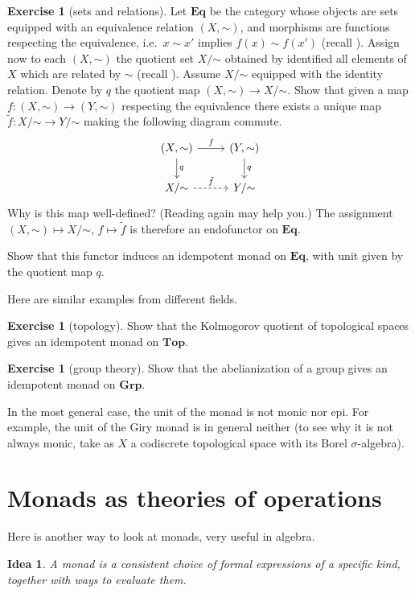 \documentclass[12pt,oneside,headings=small]{scrbook}
\def\simord{\mathord\sim}
\numberwithin{equation}{section}
\theoremstyle{plain}
\newtheorem*{idea}{Idea}
\theoremstyle{definition}
\newtheorem{ex}[thm]{Exercise}
\newcommand{\cat}[1]{{\mathbf{#1}}} %
\newcommand{\ar}[2][]{\arrow{#2}{#1}}
\newcommand{\uni}[2][]{\arrow[dashrightarrow]{#2}{#1}} %
\DeclareMathOperator{\1}{\mathbbm{1}}
\DeclareMathOperator{\2}{\mathbbm{2}}
\begin{document}
\begin{ex}[sets and relations]
 Let $\cat{Eq}$ be the category whose objects are sets equipped with an equivalence relation $(X,\simord)$, and morphisms are functions respecting the equivalence, i.e.~$x\sim x'$ implies $f(x)\sim f(x')$ (recall ).   
 Assign now to each $(X,\simord)$ the quotient set $X/\simord$ obtained by identified all elements of $X$ which are related by $\sim$ (recall ). Assume $X/\simord$ equipped with the identity relation. Denote by $q$ the quotient map $(X,\simord)\to X/\simord$.
 Show that given a map $f:(X,\simord)\to(Y,\simord)$ respecting the equivalence there exists a unique map $\tilde{f}:X/\simord\to Y/\simord$ making the following diagram commute.
 $$
 \begin{tikzcd}
  (X,\simord) \ar{d}{q} \ar{r}{f} & (Y,\simord) \ar{d}{q} \\
  X/\simord \uni{r}{\tilde{f}} & Y/\simord
 \end{tikzcd}
 $$
 Why is this map well-defined? (Reading  again may help you.)
 The assignment $(X,\simord)\mapsto X/\simord$, $f\mapsto\tilde{f}$ is therefore an endofunctor on $\cat{Eq}$.
 
 Show that this functor induces an idempotent monad on $\cat{Eq}$, with unit given by the quotient map $q$.
\end{ex}

Here are similar examples from different fields.

\begin{ex}[topology]\label{kolmogorovquotient}
 Show that the Kolmogorov quotient of topological spaces gives an idempotent monad on $\cat{Top}$.
\end{ex}

\begin{ex}[group theory]\label{abelianization}
 Show that the abelianization of a group gives an idempotent monad on $\cat{Grp}$. 
\end{ex}

In the most general case, the unit of the monad is not monic nor epi. For example, the unit of the Giry monad is in general neither (to see why it is not always monic, take as $X$ a codiscrete topological space with its Borel $\sigma$-algebra).


\section{Monads as theories of operations}

Here is another way to look at monads, very useful in algebra.
\begin{idea} 
	A monad is a consistent choice of formal expressions of a specific kind, together with ways to evaluate them. 
\end{idea}
\end{document}
